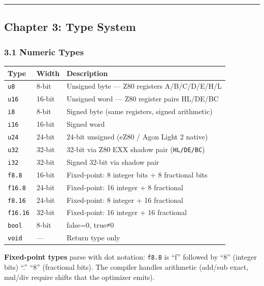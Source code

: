 \documentclass[
  11pt,
  a4paper,
]{report}
\begin{document}
\begin{center}\rule{0.5\linewidth}{0.5pt}\end{center}

\subsection{Chapter 3: Type System}\label{chapter-3-type-system}

\subsubsection{3.1 Numeric Types}\label{numeric-types}

\begin{longtable}[]{@{}lll@{}}
\toprule\noalign{}
Type & Width & Description \\
\midrule\noalign{}
\endhead
\bottomrule\noalign{}
\endlastfoot
\texttt{u8} & 8-bit & Unsigned byte --- Z80 registers A/B/C/D/E/H/L \\
\texttt{u16} & 16-bit & Unsigned word --- Z80 register pairs HL/DE/BC \\
\texttt{i8} & 8-bit & Signed byte (same registers, signed arithmetic) \\
\texttt{i16} & 16-bit & Signed word \\
\texttt{u24} & 24-bit & 24-bit unsigned (eZ80 / Agon Light 2 native) \\
\texttt{u32} & 32-bit & 32-bit via Z80 EXX shadow pair
(\texttt{HL\textquotesingle{}/DE\textquotesingle{}/BC\textquotesingle{}}) \\
\texttt{i32} & 32-bit & Signed 32-bit via shadow pair \\
\texttt{f8.8} & 16-bit & Fixed-point: 8 integer bits + 8 fractional
bits \\
\texttt{f16.8} & 24-bit & Fixed-point: 16 integer + 8 fractional \\
\texttt{f8.16} & 24-bit & Fixed-point: 8 integer + 16 fractional \\
\texttt{f16.16} & 32-bit & Fixed-point: 16 integer + 16 fractional \\
\texttt{bool} & 8-bit & false=0, true≠0 \\
\texttt{void} & --- & Return type only \\
\end{longtable}

\textbf{Fixed-point types} parse with dot notation: \texttt{f8.8} is
``f'' followed by ``8'' (integer bits) ``.'' ``8'' (fractional bits).
The compiler handles arithmetic (add/sub exact, mul/div require shifts
that the optimizer emits).
\end{document}
